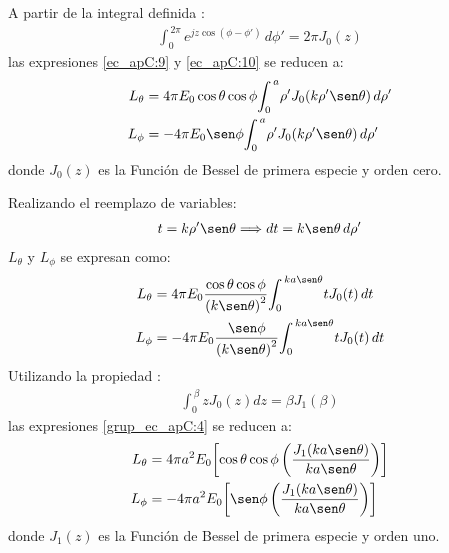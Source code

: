 A partir de la integral definida \cite{walfram_bessel_first}:
\begin{align}
\int_{0}^{\,2\pi}\!e^{jz\cos\left(\phi - \phi '\right)}\,d\phi ' = 2\pi J_0\!\left(z\right)
\label{ec_apC:11}
\end{align}
las expresiones \eqref{ec_apC:9} y \eqref{ec_apC:10} se reducen a:
\begin{subequations}
\label{grup_ec_apC:3}
\begin{align}
L_{\theta} &= 4\pi E_0\cos\theta\cos\phi\!\int_{0}^{\,a}\!\rho 'J_0\!\left(k\rho '\sen\theta\right)d\rho '
\label{ec_apC:12}\\
L_{\phi} &= - 4\pi E_0\sen\phi\!\int_{0}^{\,a}\!\rho 'J_0\!\left(k\rho '\sen\theta\right)d\rho '
\label{ec_apC:13}
\end{align}
\end{subequations}
donde $J_0\!\left(z\right)$ es la Función de Bessel de primera especie y orden cero.

Realizando el reemplazo de variables:
\begin{align}
t = k\rho '\sen\theta\Longrightarrow dt = k\sen\theta\, d\rho '
\label{ec_apC:14}
\end{align}
$L_{\theta}$ y $L_{\phi}$ se expresan como:
\begin{subequations}
\label{grup_ec_apC:4}
\begin{align}
L_{\theta} &= 4\pi E_0\frac{\cos\theta\cos\phi}{\left(k\sen\theta\right)^2}\!\int_{0}^{\,ka\sen\theta}\!tJ_0\!\left(t\right)dt
\label{ec_apC:15}\\
L_{\phi} &= - 4\pi E_0\frac{\sen\phi}{\left(k\sen\theta\right)^2}\!\int_{0}^{\,ka\sen\theta}\!tJ_0\!\left(t\right)dt
\label{ec_apC:16}
\end{align}
\end{subequations}
Utilizando la propiedad \cite{walfram_bessel_first}:
\begin{align}
\int_{0}^{\,\beta}\!zJ_0\!\left(z\right)dz = \beta J_1\!\left(\beta\right)
\label{ec_apC:17}
\end{align}
las expresiones \eqref{grup_ec_apC:4} se reducen a:
\begin{subequations}
\label{grup_ec_apC:5}
\begin{align}
L_{\theta} &= 4\pi a^2E_0\!\left[\cos\theta\cos\phi\left(\frac{J_1\!\left(ka\sen\theta\right)}{ka\sen\theta}\right)\right]
\label{ec_apC:18}\\
L_{\phi} &= - 4\pi a^2E_0\!\left[\sen\phi\left(\frac{J_1\!\left(ka\sen\theta\right)}{ka\sen\theta}\right)\right]
\label{ec_apC:19}
\end{align}
\end{subequations}
donde $J_1\!\left(z\right)$ es la Función de Bessel de primera especie y orden uno.

